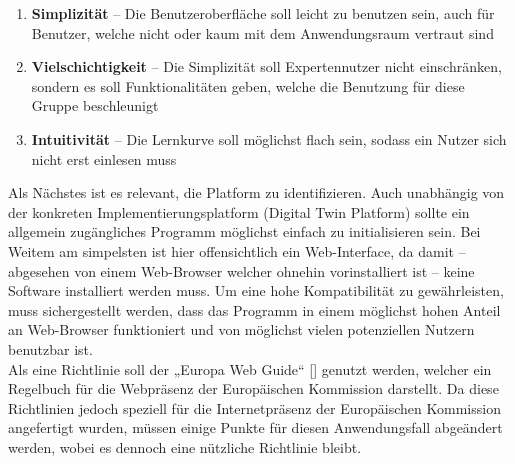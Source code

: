 \begin{enumerate}
    \item \textbf{Simplizität} – Die Benutzeroberfläche soll leicht zu benutzen sein, auch für Benutzer, welche nicht oder kaum mit dem Anwendungsraum vertraut sind
    \item \textbf{Vielschichtigkeit} – Die Simplizität soll Expertennutzer nicht einschränken, sondern es soll Funktionalitäten geben, welche die Benutzung für diese Gruppe beschleunigt
    \item \textbf{Intuitivität} – Die Lernkurve soll möglichst flach sein, sodass ein Nutzer sich nicht erst einlesen muss
\end{enumerate}

Als Nächstes ist es relevant, die Platform zu identifizieren. Auch unabhängig von der konkreten Implementierungsplatform (Digital Twin Platform) sollte ein allgemein zugängliches Programm möglichst einfach zu initialisieren sein. Bei Weitem am simpelsten ist hier offensichtlich ein Web-Interface, da damit – abgesehen von einem Web-Browser welcher ohnehin vorinstalliert ist – keine Software installiert werden muss. Um eine hohe Kompatibilität zu gewährleisten, muss sichergestellt werden, dass das Programm in einem möglichst hohen Anteil an Web-Browser funktioniert und von möglichst vielen potenziellen Nutzern benutzbar ist.\\
Als eine Richtlinie soll der „Europa Web Guide“ [\cite{guidelineWeb}] genutzt werden, welcher ein Regelbuch für die Webpräsenz der Europäischen Kommission darstellt. Da diese Richtlinien jedoch speziell für die Internetpräsenz der Europäischen Kommission angefertigt wurden, müssen einige Punkte für diesen Anwendungsfall abgeändert werden, wobei es dennoch eine nützliche Richtlinie bleibt.\nocite{guidelineBrowserSupport}\nocite{guidelineDataProtextion}

